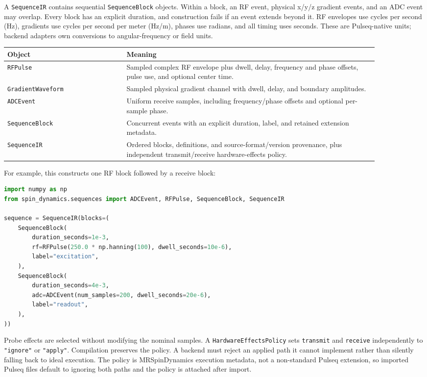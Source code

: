 \documentclass[11pt,oneside]{report}
\newcommand{\code}[1]{\texttt{#1}}
\begin{document}
A \code{SequenceIR} contains sequential \code{SequenceBlock} objects. Within a
block, an RF event, physical x/y/z gradient events, and an ADC event may overlap.
Every block has an explicit duration, and construction fails if an event extends
beyond it. RF envelopes use cycles per second (Hz), gradients use cycles per
second per meter (Hz/m), phases use radians, and all timing uses seconds. These
are Pulseq-native units; backend adapters own conversions to angular-frequency
or field units.

\begin{longtable}{p{0.29\linewidth}p{0.59\linewidth}}
\toprule
Object & Meaning \\
\midrule
\code{RFPulse} & Sampled complex RF envelope plus dwell, delay, frequency and
phase offsets, pulse use, and optional center time. \\
\code{GradientWaveform} & Sampled physical gradient channel with dwell, delay,
and boundary amplitudes. \\
\code{ADCEvent} & Uniform receive samples, including frequency/phase offsets
and optional per-sample phase. \\
\code{SequenceBlock} & Concurrent events with an explicit duration, label, and
retained extension metadata. \\
\code{SequenceIR} & Ordered blocks, definitions, and source-format/version
provenance, plus independent transmit/receive hardware-effects policy. \\
\bottomrule
\end{longtable}

For example, this constructs one RF block followed by a receive block:

\begin{lstlisting}[language=Python]
import numpy as np
from spin_dynamics.sequences import ADCEvent, RFPulse, SequenceBlock, SequenceIR

sequence = SequenceIR(blocks=(
    SequenceBlock(
        duration_seconds=1e-3,
        rf=RFPulse(250.0 * np.hanning(100), dwell_seconds=10e-6),
        label="excitation",
    ),
    SequenceBlock(
        duration_seconds=4e-3,
        adc=ADCEvent(num_samples=200, dwell_seconds=20e-6),
        label="readout",
    ),
))
\end{lstlisting}

Probe effects are selected without modifying the nominal samples. A
\code{HardwareEffectsPolicy} sets \code{transmit} and \code{receive}
independently to \code{"ignore"} or \code{"apply"}. Compilation preserves the
policy. A backend must reject an applied path it cannot implement rather than
silently falling back to ideal execution. The policy is MRSpinDynamics
execution metadata, not a non-standard Pulseq extension, so imported Pulseq
files default to ignoring both paths and the policy is attached after import.
\end{document}
